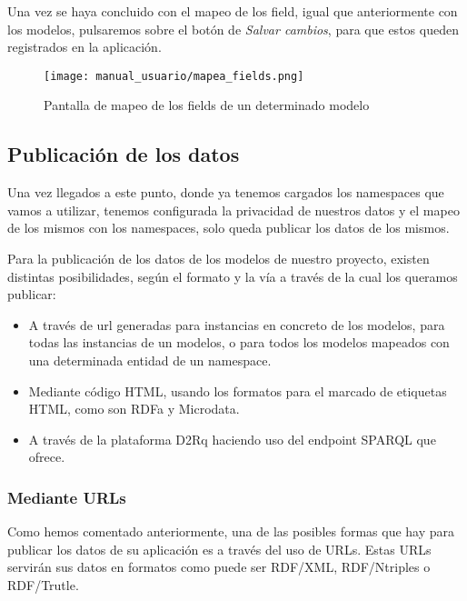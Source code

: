 Una vez se haya concluido con el mapeo de los field, igual que anteriormente con
los modelos, pulsaremos sobre el botón de \textit{Salvar cambios}, para que
estos queden registrados en la aplicación.

\newpage

\begin{figure}[H]
    \begin{center}
        \texttt{[image: manual\_usuario/mapea\_fields.png]}
    \end{center}
    \caption{Pantalla de mapeo de los fields de un determinado modelo}
    \label{fig:mapea_fields}
\end{figure}

\subsection{Publicación de los datos}

Una vez llegados a este punto, donde ya tenemos cargados los namespaces que
vamos a utilizar, tenemos configurada la privacidad de nuestros datos y el mapeo
de los mismos con los namespaces, solo queda publicar los datos de los mismos.

Para la publicación de los datos de los modelos de nuestro proyecto, existen
distintas posibilidades, según el formato y la vía a través de la cual
los queramos publicar:
\begin{itemize}
    \item A través de url generadas para instancias en concreto de los modelos,
    para todas las instancias de un modelos, o para todos los modelos mapeados
    con una determinada entidad de un namespace.
    \item Mediante código HTML, usando los formatos para el marcado de
    etiquetas HTML, como son RDFa y Microdata.
    \item A través de la plataforma D2Rq haciendo uso del endpoint SPARQL que
    ofrece.
\end{itemize}

\subsubsection{Mediante URLs}

Como hemos comentado anteriormente, una de las posibles formas que hay para
publicar los datos de su aplicación es a través del uso de URLs. Estas URLs
servirán sus datos en formatos como puede ser RDF/XML, RDF/Ntriples o
RDF/Trutle.

